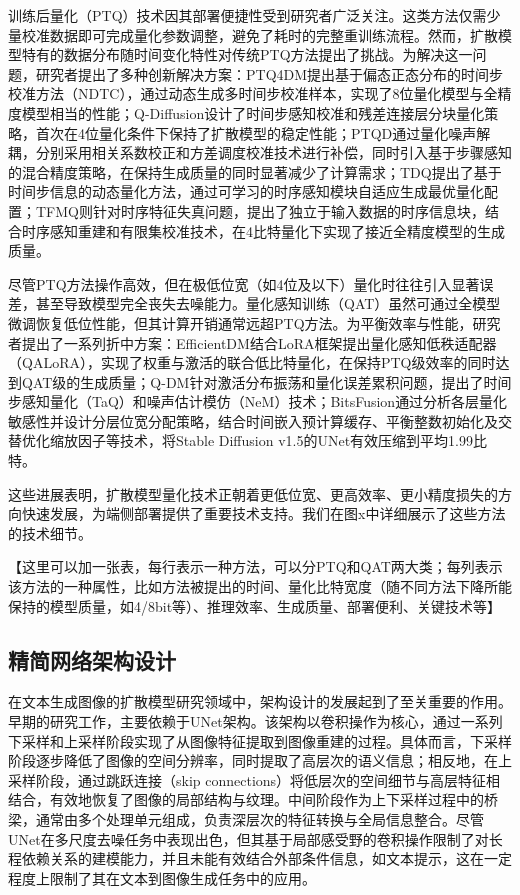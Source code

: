 \documentclass[11pt,a4paper,UTF8]{ctexart}
\begin{document}
训练后量化（PTQ）技术因其部署便捷性受到研究者广泛关注。这类方法仅需少量校准数据即可完成量化参数调整，避免了耗时的完整重训练流程。然而，扩散模型特有的数据分布随时间变化特性对传统PTQ方法提出了挑战。为解决这一问题，研究者提出了多种创新解决方案：PTQ4DM\cite{shang2023post}提出基于偏态正态分布的时间步校准方法（NDTC），通过动态生成多时间步校准样本，实现了8位量化模型与全精度模型相当的性能；Q-Diffusion\cite{li2023q}设计了时间步感知校准和残差连接层分块量化策略，首次在4位量化条件下保持了扩散模型的稳定性能；PTQD\cite{he2023ptqd}通过量化噪声解耦，分别采用相关系数校正和方差调度校准技术进行补偿，同时引入基于步骤感知的混合精度策略，在保持生成质量的同时显著减少了计算需求；TDQ\cite{so2023temporal}提出了基于时间步信息的动态量化方法，通过可学习的时序感知模块自适应生成最优量化配置；TFMQ\cite{Huang_2024_CVPR}则针对时序特征失真问题，提出了独立于输入数据的时序信息块，结合时序感知重建和有限集校准技术，在4比特量化下实现了接近全精度模型的生成质量。

尽管PTQ方法操作高效，但在极低位宽（如4位及以下）量化时往往引入显著误差，甚至导致模型完全丧失去噪能力\cite{he2023ptqd}。量化感知训练（QAT）\cite{krishnamoorthi2018quantizing,esser2019learned}虽然可通过全模型微调恢复低位性能，但其计算开销通常远超PTQ方法。为平衡效率与性能，研究者提出了一系列折中方案：EfficientDM\cite{he2024efficientdm}结合LoRA框架\cite{hu2022lora}提出量化感知低秩适配器（QALoRA），实现了权重与激活的联合低比特量化，在保持PTQ级效率的同时达到QAT级的生成质量；Q-DM\cite{li2023qdm}针对激活分布振荡和量化误差累积问题，提出了时间步感知量化（TaQ）和噪声估计模仿（NeM）技术；BitsFusion\cite{sui2024bitsfusion}通过分析各层量化敏感性并设计分层位宽分配策略，结合时间嵌入预计算缓存、平衡整数初始化及交替优化缩放因子等技术，将Stable Diffusion v1.5的UNet有效压缩到平均1.99比特。

这些进展表明，扩散模型量化技术正朝着更低位宽、更高效率、更小精度损失的方向快速发展，为端侧部署提供了重要技术支持。我们在图x中详细展示了这些方法的技术细节。

【这里可以加一张表，每行表示一种方法，可以分PTQ和QAT两大类；每列表示该方法的一种属性，比如方法被提出的时间、量化比特宽度（随不同方法下降所能保持的模型质量，如4/8bit等）、推理效率、生成质量、部署便利、关键技术等】

\subsection{精简网络架构设计}

\iffalse
在文本生成图像的扩散模型研究领域中，架构设计的发展起到了至关重要的作用。早期的研究工作\cite{song2019generative, ho2020denoising}，主要依赖于UNet架构\cite{ronneberger2015u}。该架构以卷积操作为核心，通过一系列下采样和上采样阶段实现了从图像特征提取到图像重建的过程。具体而言，下采样阶段逐步降低了图像的空间分辨率，同时提取了高层次的语义信息；相反地，在上采样阶段，通过跳跃连接（skip connections）将低层次的空间细节与高层特征相结合，有效地恢复了图像的局部结构与纹理。中间阶段作为上下采样过程中的桥梁，通常由多个处理单元组成，负责深层次的特征转换与全局信息整合。尽管UNet在多尺度去噪任务中表现出色，但其基于局部感受野的卷积操作限制了对长程依赖关系的建模能力，并且未能有效结合外部条件信息，如文本提示，这在一定程度上限制了其在文本到图像生成任务中的应用。
\end{document}
